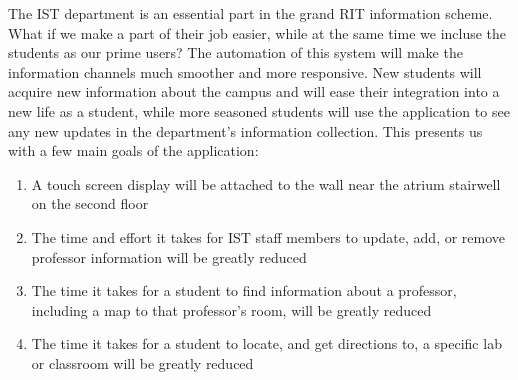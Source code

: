The IST department is an essential part in the grand RIT information scheme. What if we make a part of their job easier, while at the same time we incluse the students as our prime users? The automation of this system will make the information channels much smoother and more responsive. New students will acquire new information about the campus and will ease their integration into a new life as a student, while more seasoned students will use the application to see any new updates in the department's information collection. This presents us with a few main goals of the application:

\begin{enumerate}
	\item A touch screen display will be attached to the wall near the atrium stairwell on the second floor
	\item The time and effort it takes for IST staff members to update, add, or remove professor information will be greatly reduced
	\item The time it takes for a student to find information about a professor, including a map to that professor's room, will be greatly reduced
	\item The time it takes for a student to locate, and get directions to, a specific lab or classroom will be greatly reduced
\end{enumerate}